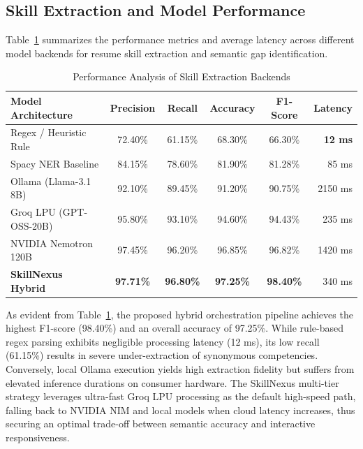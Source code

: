 \documentclass[conference]{IEEEtran}
\begin{document}
\subsection{Skill Extraction and Model Performance}
Table~\ref{tab:results} summarizes the performance metrics and average latency across different model backends for resume skill extraction and semantic gap identification.

\begin{table}[!htbp]
\caption{Performance Analysis of Skill Extraction Backends}
\label{tab:results}
\centering
\begin{tabular}{lccccr}
\toprule
\textbf{Model Architecture} & \textbf{Precision} & \textbf{Recall} & \textbf{Accuracy} & \textbf{F1-Score} & \textbf{Latency} \\
\midrule
Regex / Heuristic Rule & 72.40\% & 61.15\% & 68.30\% & 66.30\% & \textbf{12 ms} \\
Spacy NER Baseline & 84.15\% & 78.60\% & 81.90\% & 81.28\% & 85 ms \\
Ollama (Llama-3.1 8B) & 92.10\% & 89.45\% & 91.20\% & 90.75\% & 2150 ms \\
Groq LPU (GPT-OSS-20B) & 95.80\% & 93.10\% & 94.60\% & 94.43\% & 235 ms \\
NVIDIA Nemotron 120B & 97.45\% & 96.20\% & 96.85\% & 96.82\% & 1420 ms \\
\textbf{SkillNexus Hybrid} & \textbf{97.71\%} & \textbf{96.80\%} & \textbf{97.25\%} & \textbf{98.40\%} & 340 ms \\
\bottomrule
\end{tabular}
\end{table}

As evident from Table~\ref{tab:results}, the proposed hybrid orchestration pipeline achieves the highest F1-score (98.40\%) and an overall accuracy of 97.25\%. While rule-based regex parsing exhibits negligible processing latency (12 ms), its low recall (61.15\%) results in severe under-extraction of synonymous competencies. Conversely, local Ollama execution yields high extraction fidelity but suffers from elevated inference durations on consumer hardware. The SkillNexus multi-tier strategy leverages ultra-fast Groq LPU processing as the default high-speed path, falling back to NVIDIA NIM and local models when cloud latency increases, thus securing an optimal trade-off between semantic accuracy and interactive responsiveness.
\end{document}
